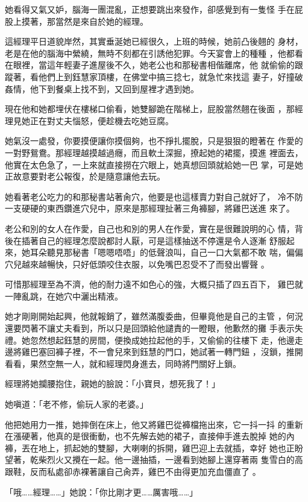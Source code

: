 她看得又氣又妒，腦海一團混亂，正想要跳出來發作，卻感覺到有一隻怪
手在屁股上摸著，那當然是來自於她的經理。

這經理平日道貌岸然，其實垂涎她已經很久，上班的時候，她前凸後翹的
身材，老是在他的腦海中縈繞，無時不刻都在引誘他犯罪。今天宴會上的種種
，他都看在眼裡，當這年輕妻子進屋後不久，她老公也和那秘書相偕離席，他
就偷偷的跟蹤著，看他們上到鈺慧家頂樓，在佛堂中搞三捻七，就急忙來找這
妻子，好撞破姦情，他下到餐桌上找不到，又回到屋裡才遇到她。

現在他和她都埋伏在樓梯口偷看，她雙腳跪在階梯上，屁股當然翹在後面
，那經理見她正在對丈夫惱怒，便趁機去吃她豆腐。

她氣沒一處發，你要摸便讓你摸個夠，也不掙扎擺脫，只是狠狠的瞪著在
作愛的一對野鴛鴦。那經理越摸越過癮，而且軟土深掘，撩起她的裙擺，摸進
裡面去，他實在太色急了，一上來就直接撈在穴眼上，她真想回頭就給她一巴
掌，可是她正故意要對老公報復，於是隨意讓他去玩。

她看著老公吃力的和那秘書站著肏穴，他要是也這樣賣力對自己就好了，
冷不防一支硬硬的東西鑽進穴兒中，原來是那經理扯著三角褲腳，將雞巴送進
來了。

老公和別的女人在作愛，自己也和別的男人在作愛，實在是很難說明的心
情，背後在插著自己的經理怎麼說都討人厭，可是這樣抽送不停還是令人逐漸
舒服起來，她耳朵聽見那秘書「嗯嗯唔唔」的低聲浪叫，自己一口大氣都不敢
喘，偏偏穴兒越來越暢快，只好低頭咬住衣服，以免嘴巴忍受不了而發出響聲
。

可惜那經理至為不濟，他的耐力遠不如色心的強，大概只插了四五百下，
雞巴就一陣亂跳，在她穴中灑出精液。

她才剛剛開始起興，他就報銷了，雖然滿腹委曲，但畢竟他是自己的主管
，何況還要閃著不讓丈夫看到，所以只是回頭給他譴責的一瞪眼，他歉然的攤
手表示失禮。她忽然想起鈺慧的房間，便換成她拉起他的手，又偷偷的往樓下
走，他邊走邊將雞巴塞回褲子裡，不一會兒來到鈺慧的門口，她試著一轉門鈕
，沒鎖，推開看看，果然空無一人，就和經理閃身進去，同時將門關好上鎖。

經理將她攔腰抱住，親她的臉說：「小寶貝，想死我了！」

她嗔道：「老不修，偷玩人家的老婆。」

他把她用力一推，她摔倒在床上，他又將雞巴從褲檔拖出來，它一抖一抖
的重新在漲硬著，他真的是很衝動，也不先解去她的裙子，直接伸手進去脫掉
她的內褲，丟在地上，抓起她的雙腳，大喇喇的拆開，雞巴迎上去就插，幸好
她也正盼望著，乾柴烈火又攪在一起。他一邊抽插，一邊看到她腳上還穿著兩
隻雪白的高跟鞋，反而私處卻赤裸著讓自己肏弄，雞巴不由得更加充血僵直了
。

「哦……經理……」她說：「你比剛才更……厲害哦……」

